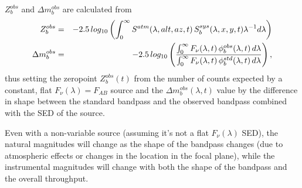 \documentclass[12pt,preprint]{aastex}
\begin{document}
$Z_b^{obs}$ and $\Delta m_b^{obs}$ are calculated from 
\begin{eqnarray}
Z_b^{obs} & = & -2.5\,log_{10} \left( {\int_0^\infty {S^{atm}(\lambda,alt,az,t) \, S_b^{sys}(\lambda,x,y,t) \lambda^{-1}d\lambda} } \right) \\
\Delta m_b^{obs} & = &-2.5\, log_{10} \left( { \int_0^\infty {F_\nu(\lambda,t) \,
    \phi_b^{obs}(\lambda,t) \, d\lambda} \over \int_0^\infty {F_\nu(\lambda,t) \,
    \phi_b^{std}(\lambda,t) \, d\lambda}} \right),
\end{eqnarray}
thus setting the zeropoint $Z_b^{obs}(t)$ from the number of counts expected by a constant, flat $F_\nu(\lambda) = F_{AB}$ source and the $\Delta  m_b^{obs}(\lambda, t)$ value by the difference in shape between the standard bandpass and the observed bandpass combined with the SED of the source. 

Even with a non-variable source (assuming it's not a flat $F_\nu(\lambda)$ SED), the natural magnitudes will change as the shape of the bandpass changes (due to atmospheric effects or changes in the location in the focal plane), while the instrumental magnitudes will change with both the shape of the bandpass and the overall throughput.  
\end{document}
